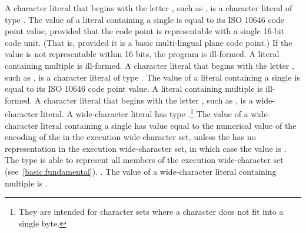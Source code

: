 \pnum
{}%
%
%
%
%
%
%
A character literal that begins with the letter , such as
, is a character literal of type . The value
of a  literal containing a single  is
equal to its ISO 10646 code point value, provided that the code point is
representable with a single 16-bit code unit. (That is, provided it is a
basic multi-lingual plane code point.) If the value is not representable
within 16 bits, the program is ill-formed. A  literal
containing multiple  is ill-formed. A character
literal that begins with the letter , such as , is
a character literal of type . The value of a
 literal containing a single  is equal
to its ISO 10646 code point value. A  literal containing
multiple  is ill-formed. A character literal that
begins with the letter , such as ,
%
is a wide-character literal. A wide-character literal has type
.\footnote{They are intended for character sets where a character does
not fit into a single byte. }
The value of a wide-character literal containing a single
 has value equal to the numerical value of the encoding
of the  in the execution wide-character set, unless the
 has no representation in the execution wide-character set, in which
case the value is . \enternote The type  is able to
represent all members of the execution wide-character set (see~\ref{basic.fundamental}).
\exitnote. The value
of a wide-character literal containing multiple  is
.


